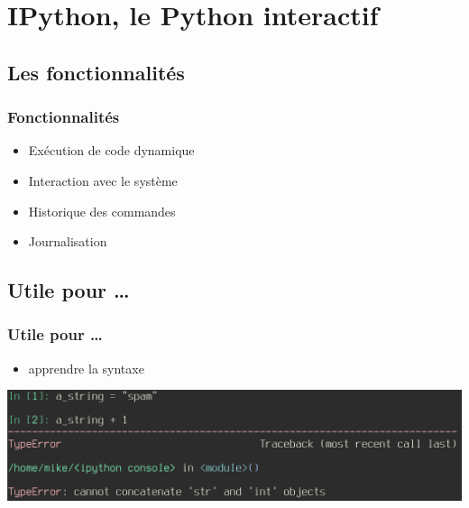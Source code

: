 \section{IPython, le Python interactif}
\subsection{Les fonctionnalités}

\begin{frame}
  \frametitle{Fonctionnalités}
  \begin{itemize}
    \item Exécution de code dynamique
    \item Interaction avec le système
    \item Historique des commandes
    \item Journalisation
  \end{itemize}
\end{frame}

\subsection{Utile pour \ldots}
\begin{frame}[fragile]
  \frametitle{Utile pour \ldots}
    \begin{itemize}
      \item apprendre la syntaxe
    \end{itemize}
  \includegraphics[scale=0.35]{apprendre.png}

\end{frame}

